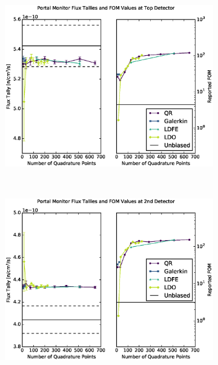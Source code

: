 \documentclass{article} %
\begin{document}
\begin{figure}[!htb]
\begin{subfigure}{\textwidth}
\centering
\includegraphics[max height=0.445\textheight]
{img/portal-fwcadis-1.eps}
\end{subfigure}
\\
\begin{subfigure}{\textwidth}
\centering
\includegraphics[max height=0.445\textheight]
{img/portal-fwcadis-2.eps}
\end{subfigure}
\end{figure}
\end{document}
